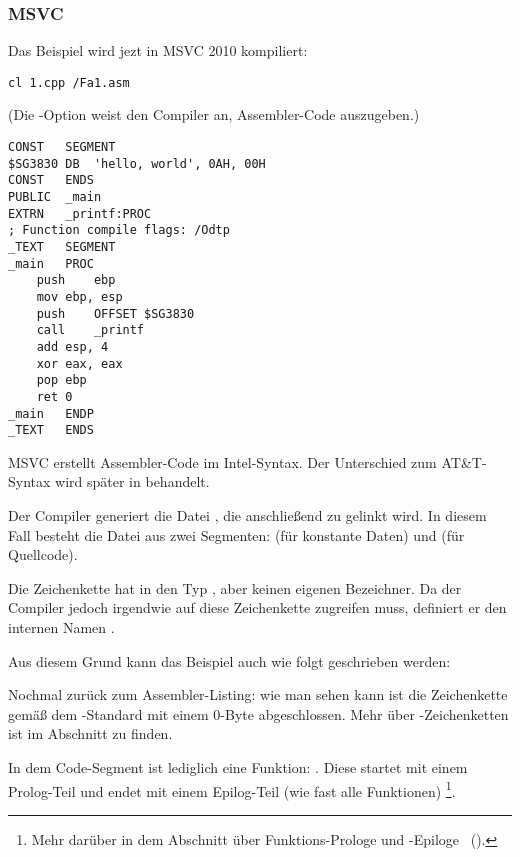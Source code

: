\subsubsection{MSVC}

Das Beispiel wird jezt in MSVC 2010 kompiliert:

\begin{lstlisting}
cl 1.cpp /Fa1.asm
\end{lstlisting}

(Die -Option weist den Compiler an, Assembler-Code auszugeben.)

\begin{lstlisting}[caption=MSVC 2010]
CONST	SEGMENT
$SG3830	DB	'hello, world', 0AH, 00H
CONST	ENDS
PUBLIC	_main
EXTRN	_printf:PROC
; Function compile flags: /Odtp
_TEXT	SEGMENT
_main	PROC
	push	ebp
	mov	ebp, esp
	push	OFFSET $SG3830
	call	_printf
	add	esp, 4
	xor	eax, eax
	pop	ebp
	ret	0
_main	ENDP
_TEXT	ENDS
\end{lstlisting}

MSVC erstellt Assembler-Code im Intel-Syntax.
Der Unterschied zum AT\&T-Syntax wird später in  behandelt.

Der Compiler generiert die Datei , die anschließend zu  gelinkt wird.
In diesem Fall besteht die Datei aus zwei Segmenten:  (für konstante Daten) und  (für Quellcode).

\label{string_is_const_char}
Die Zeichenkette  hat in \CCpp den Typ , aber keinen eigenen Bezeichner.
Da der Compiler jedoch irgendwie auf diese Zeichenkette zugreifen muss, definiert er den internen Namen .

Aus diesem Grund kann das Beispiel auch wie folgt geschrieben werden:



Nochmal zurück zum Assembler-Listing: wie man sehen kann ist die Zeichenkette gemäß dem \CCpp-Standard mit einem 0-Byte abgeschlossen.
Mehr über \CCpp-Zeichenketten ist im Abschnitt  zu finden.

In dem Code-Segment  ist lediglich eine Funktion: \main{}.
Diese startet mit einem Prolog-Teil und endet mit einem Epilog-Teil (wie fast alle Funktionen)
\footnote{Mehr darüber in dem Abschnitt über Funktions-Prologe und -Epiloge ~().}.

